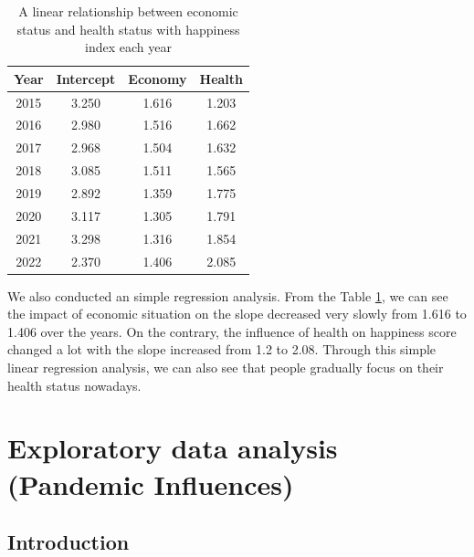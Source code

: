 \documentclass[11pt,a4paper,]{article}
\begin{document}
\newpage

\begin{table}
\centering
\begin{tabular}{|c|c|c|c|}
\hline
\textbf{Year} & \textbf{Intercept} & \textbf{Economy} & \textbf{Health} \\
\hline
2015          & 3.250              & 1.616            & 1.203           \\
2016          & 2.980              & 1.516            & 1.662           \\
2017          & 2.968              & 1.504            & 1.632           \\
2018          & 3.085              & 1.511            & 1.565           \\
2019          & 2.892              & 1.359            & 1.775           \\
2020          & 3.117              & 1.305            & 1.791           \\
2021          & 3.298              & 1.316            & 1.854           \\
2022          & 2.370              & 1.406            & 2.085           \\
\hline
\end{tabular}
\caption{A linear relationship between economic status and health status with happiness index each year}
\label{tab:table}
\end{table}

We also conducted an simple regression analysis. From the Table \ref{tab:table}, we can see the impact of economic situation on the slope decreased very slowly from 1.616 to 1.406 over the years. On the contrary, the influence of health on happiness score changed a lot with the slope increased from 1.2 to 2.08. Through this simple linear regression analysis, we can also see that people gradually focus on their health status nowadays.

\newpage

\hypertarget{exploratory-data-analysis-pandemic-influences}{%
\section{Exploratory data analysis (Pandemic Influences)}\label{exploratory-data-analysis-pandemic-influences}}

\hypertarget{introduction-1}{%
\subsection{Introduction}\label{introduction-1}}
\end{document}
